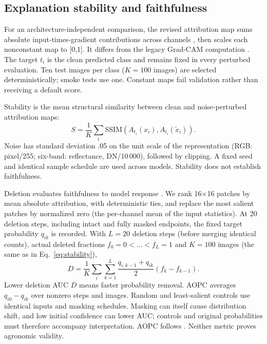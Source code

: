 \documentclass[3p,times,procedia]{elsarticle}
\begin{document}
\subsection{Explanation stability and faithfulness}\label{sec:explanation}
For an architecture-independent comparison, the revised attribution map sums absolute input-times-gradient contributions across channels \cite{attribution}, then scales each nonconstant map to [0,1]. It differs from the legacy Grad-CAM computation \cite{gradcam}. The target $t_i$ is the clean predicted class and remains fixed in every perturbed evaluation. Ten test images per class ($K=100$ images) are selected deterministically; smoke tests use one. Constant maps fail validation rather than receiving a default score.

Stability is the mean structural similarity \cite{ssim} between clean and noise-perturbed attribution maps:
\begin{equation}S=\frac1K\sum_i\mathrm{SSIM}(A_{t_i}(x_i),A_{t_i}(\tilde x_i)).\label{eq:stability}\end{equation}
Noise has standard deviation .05 on the unit scale of the representation (RGB: pixel/255; six-band: reflectance, DN/10\,000), followed by clipping. A fixed seed and identical sample schedule are used across models. Stability does not establish faithfulness.

Deletion evaluates faithfulness to model response \cite{rise}. We rank 16$\times$16 patches by mean absolute attribution, with deterministic ties, and replace the most salient patches by normalized zero (the per-channel mean of the input statistics). At 20 deletion steps, including intact and fully masked endpoints, the fixed target probability $q_{ik}$ is recorded. With $L=20$ deletion steps (before merging identical counts), actual deleted fractions $f_0=0<\dots<f_L=1$ and $K=100$ images (the same as in Eq.~\eqref{eq:stability}),
\begin{equation}D=\frac1K\sum_i\sum_{k=1}^{L}\frac{q_{i,k-1}+q_{ik}}2(f_k-f_{k-1}).\label{eq:deletion}\end{equation}
Lower deletion AUC $D$ means faster probability removal. AOPC averages $q_{i0}-q_{ik}$ over nonzero steps and images. Random and least-salient controls use identical inputs and masking schedules. Masking can itself cause distribution shift, and low initial confidence can lower AUC; controls and original probabilities must therefore accompany interpretation. AOPC follows \cite{aopc}. Neither metric proves agronomic validity.
\end{document}
